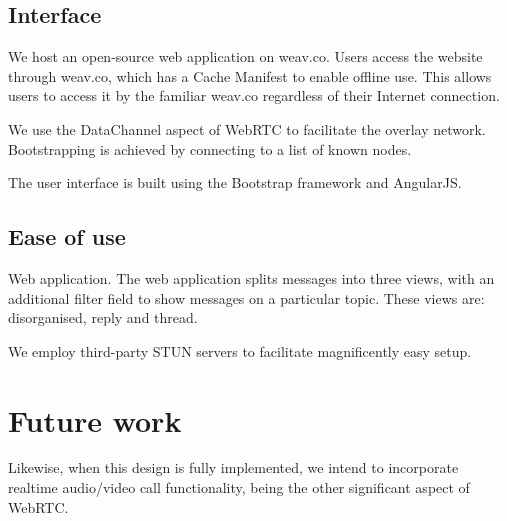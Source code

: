\documentclass[10pt,a4paper,onecolumn]{article}
\begin{document}
\subsection{Interface}
We host an open-source web application on weav.co. Users access the website through weav.co, which has a Cache Manifest to enable offline use. This allows users to access it by the familiar weav.co regardless of their Internet connection. 

We use the DataChannel aspect of WebRTC to facilitate the overlay network.  Bootstrapping is achieved by connecting to a list of known nodes.

The user interface is built using the Bootstrap framework and AngularJS. 

\subsection{Ease of use}
Web application. The web application splits messages into three views, with an additional filter field to show messages on a particular topic. These views are: disorganised, reply and thread. 

We employ third-party STUN servers to facilitate magnificently easy setup. 

\section{Future work}


Likewise, when this design is fully implemented, we intend to incorporate realtime audio/video call functionality, being the other significant aspect of WebRTC.
\end{document}
